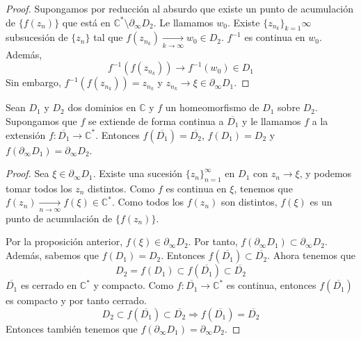 \begin{proof}
    Supongamos por reducción al absurdo que existe un punto de acumulación de $\{f(z_n)\}$ que está en $\mathbb{C}^\ast \setminus \partial_\infty D_2$.
    Le llamamos $w_0$.
    Existe $\{z_{n_k}\}_{k=1}\infty$ subsucesión de $\{z_n\}$ tal que $f(z_{n_k}) \xrightarrow[k \to \infty]{} w_0 \in D_2$.
    $f^{-1}$ es continua en $w_0$.
    Además,
    $$f^{-1}(f(z_{n_k})) \to f^{-1}(w_0) \in D_1$$
    Sin embargo, $f^{-1}(f(z_{n_k})) = z_{n_k}$ y $z_{n_k} \to \xi \in \partial_\infty D_1$.
\end{proof}

\begin{proposition}
    Sean $D_1$ y $D_2$ dos dominios en $\mathbb{C}$ y $f$ un homeomorfismo de $D_1$ sobre $D_2$.
    Supongamos que $f$ se extiende de forma continua a $\overline{D_1}$ y le llamamos $f$ a la extensión $f: \overline{D_1} \to \mathbb{C}^\ast$.
    Entonces $f(\overline{D_1}) = \overline{D_2}$, $f(D_1) = D_2$ y $f(\partial_\infty D_1) = \partial_\infty D_2$.
\end{proposition}

\begin{proof}
    Sea $\xi \in \partial_\infty D_1$.
    Existe una sucesión $\{z_n\}_{n=1}^\infty$ en $D_1$ con $z_n \to \xi$, y podemos tomar todos los $z_n$ distintos.
    Como $f$ es continua en $\xi$, tenemos que $f(z_n) \xrightarrow[n \to \infty]{} f(\xi) \in \mathbb{C}^\ast$.
    Como todos los $f(z_n)$ son distintos, $f(\xi)$ es un punto de acumulación de $\{f(z_n)\}$.

    Por la proposición anterior, $f(\xi) \in \partial_\infty D_2$.
    Por tanto, $f(\partial_\infty D_1) \subset \partial_\infty D_2$.
    Además, sabemos que $f(D_1) = D_2$.
    Entonces $f(\overline{D_1}) \subset \overline{D_2}$.
    Ahora tenemos que
    $$D_2 = f(D_1) \subset f(\overline{D_1}) \subset \overline{D_2}$$
    $\overline{D_1}$ es cerrado en $\mathbb{C}^\ast$ y compacto.
    Como $f: \overline{D_1} \to \mathbb{C}^\ast$ es continua, entonces $f(\overline{D_1})$ es compacto y por tanto cerrado.
    $$D_2 \subset f(\overline{D_1}) \subset \overline{D_2} \Rightarrow f(\overline{D_1}) = \overline{D_2}$$
    Entonces también tenemos que $f(\partial_\infty D_1) = \partial_\infty D_2$.
\end{proof}

